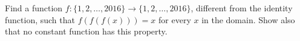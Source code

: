Find a function $f:\{1,2,\dots,2016\}\to\{1,2,\dots,2016\}$, different from the identity function, such that $f(f(f(x)))=x$ for every $x$ in the domain. Show also that no constant function has this property.
